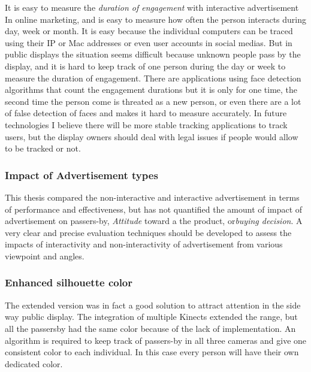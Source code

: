 It is easy to measure the \emph{duration of engagement} with interactive advertisement In online marketing, and is easy to measure how often the person interacts during day, week or month. It is easy because the individual computers can be traced using their IP or Mac addresses or even user accounts in social medias. But in public displays the situation seems difficult because unknown people pass by the display, and it is hard to keep track of one person during the day or week to measure the duration of engagement. There are applications \cite{glancingcount} using face detection algorithms that count the engagement durations but it is only for one time, the second time the person come is threated as a new person, or even there are a lot of false detection of faces and makes it hard to measure accurately. In future technologies I believe there will be more stable tracking applications to track users, but the display owners should deal with legal issues if people would allow to be tracked or not. 

\subsubsection{Impact of Advertisement types}
This thesis compared the non-interactive and interactive advertisement in terms of performance and effectiveness, but has not quantified the amount of impact of advertisement on passers-by, \emph{Attitude} toward a the product, or\emph{buying decision}. A very clear and precise evaluation techniques should be developed to assess the impacts of interactivity and non-interactivity of advertisement from various viewpoint and angles.

\subsubsection{Enhanced silhouette color}
The extended version was in fact a good solution to attract attention in the side way public display. The integration of multiple Kinects extended the range, but all the passersby had the same color because of the lack of implementation. An algorithm is required to keep track of passers-by in all three cameras and give one consistent color to each individual. In this case every person will have their own dedicated color.

